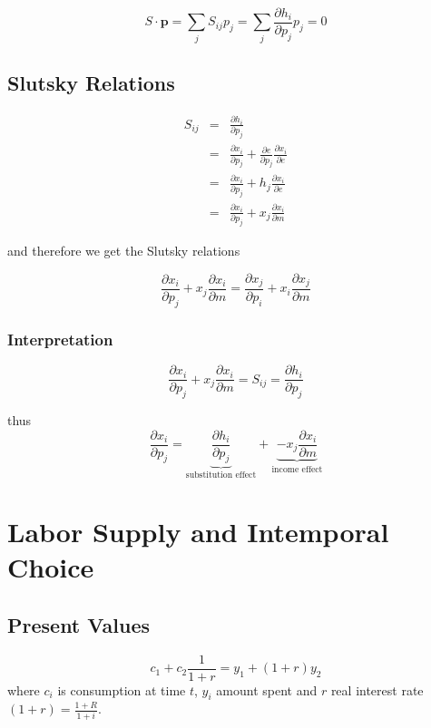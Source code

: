\documentclass[a4paper] {scrartcl}
\begin{document}
\begin{equation}
	S\cdot \mathbf{p} = \sum_j S_{ij}p_j = \sum_j \frac{\partial h_i}{\partial p_j}p_j = 0
\end{equation}

\subsection{Slutsky Relations}
\begin{eqnarray}
	S_{ij} &=& \frac{\partial h_i}{\partial p_j}\\
	&=& \frac{\partial x_i}{\partial p_j}
	+\frac{\partial e}{\partial p_j}\frac{\partial x_i}{\partial e}\\
	&=& \frac{\partial x_i}{\partial p_j}
	+h_j\frac{\partial x_i}{\partial e}\\
	&=& \frac{\partial x_i}{\partial p_j}
	+x_j\frac{\partial x_i}{\partial m}
\end{eqnarray}

and therefore we get the Slutsky relations

\begin{equation}
	\frac{\partial x_i}{\partial p_j}
	+x_j\frac{\partial x_i}{\partial m}
	=
	\frac{\partial x_j}{\partial p_i}
	+x_i\frac{\partial x_j}{\partial m}
\end{equation}

\subsubsection{Interpretation}
\begin{equation}
	\frac{\partial x_i}{\partial p_j}
	+x_j\frac{\partial x_i}{\partial m} = S_{ij} = \frac{\partial h_i}{\partial p_j}
\end{equation}

thus
\begin{equation}
	\frac{\partial x_i}{\partial p_j} = 
	\underbrace{\frac{\partial h_i}{\partial p_j}}_{\text{substitution effect}}
	+
	\underbrace{- x_j\frac{\partial x_i}{\partial m}}_{\text{income effect}}
\end{equation}


\section{Labor Supply and Intemporal Choice}


\subsection{Present Values}
\begin{equation}
	c_1+c_2\frac{1}{1+r}=y_1+(1+r)y_2
\end{equation}
where $c_i$ is consumption at time $t$, $y_i$ amount spent and $r$ real interest rate $(1+r)=\frac{1+R}{1+i}$.
\end{document}
